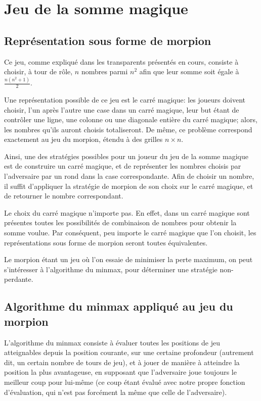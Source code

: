 \section{Jeu de la somme magique}

\subsection{Représentation sous forme de morpion}
Ce jeu, comme expliqué dans les transparents présentés en cours,
consiste à choisir, à tour de rôle, $n$ nombres parmi $n^2$ afin que
leur somme soit égale à $\frac{n(n^2+1)}{2}$.

Une représentation possible de ce jeu est le carré magique: les
joueurs doivent choisir, l'un après l'autre une case dans un carré
magique, leur but étant de contrôler une ligne, une colonne ou une
diagonale entière du carré magique; alors, les nombres qu'ils auront
choisis totaliseront.  De même, ce problème correspond exactement au
jeu du morpion, étendu à des grilles $n \times n$.

Ainsi, une des stratégies possibles pour un joueur du jeu de la somme
magique est de construire un carré magique, et de représenter les
nombres choisis par l'adversaire par un rond dans la case
correspondante. Afin de choisir un nombre, il suffit d'appliquer la
stratégie de morpion de son choix sur le carré magique, et de
retourner le nombre correspondant.

Le choix du carré magique n'importe pas. En effet, dans un carré
magique sont présentes toutes les possibilités de combinaison de
nombres pour obtenir la somme voulue. Par conséquent, peu importe le
carré magique que l'on choisit, les représentations sous forme de
morpion seront toutes équivalentes.

Le morpion étant un jeu où l'on essaie de minimiser la perte maximum,
on peut s'intéresser à l'algorithme du minmax, pour déterminer une
stratégie non-perdante.

\subsection{Algorithme du minmax appliqué au jeu du morpion}
L'algorithme du minmax consiste à évaluer toutes les positions de jeu
atteignables depuis la position courante, sur une certaine profondeur
(autrement dit, un certain nombre de tours de jeu), et à jouer de
manière à atteindre la position la plus avantageuse, en supposant que
l'adversaire joue toujours le meilleur coup pour lui-même (ce coup
étant évalué avec notre propre fonction d'évaluation, qui n'est pas
forcément la même que celle de l'adversaire).

